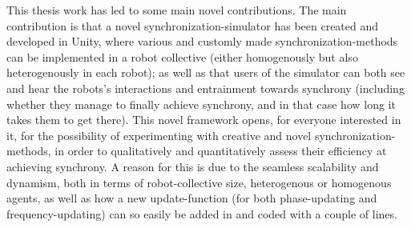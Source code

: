 This thesis work has led to some main novel contributions. The main contribution is that a novel synchronization-simulator has been created and developed in Unity, where various and customly made synchronization-methods can be implemented in a robot collective (either homogenously but also heterogenously in each robot); as well as that users of the simulator can both see and hear the robots's interactions and entrainment towards synchrony (including whether they manage to finally achieve synchrony, and in that case how long it takes them to get there). This novel framework opens, for everyone interested in it, for the possibility of experimenting with creative and novel synchronization-methods, in order to qualitatively and quantitatively assess their efficiency at achieving synchrony. A reason for this is due to the seamless scalability and dynamism, both in terms of robot-collective size, heterogenous or homogenous agents, as well as how a new update-function (for both phase-updating and frequency-updating) can so easily be added in and coded with a couple of lines.

